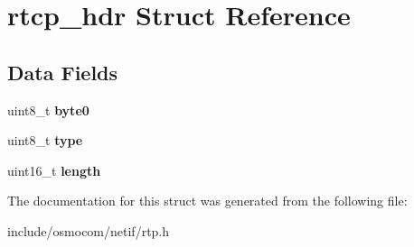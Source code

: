 \section{rtcp\+\_\+hdr Struct Reference}
\label{structrtcp__hdr}
\subsection*{Data Fields}
\begin{DoxyCompactItemize}
\item 
uint8\+\_\+t {\bfseries byte0}\label{structrtcp__hdr_a9d30cb444d699f9e1ba34f2097f98c8f}

\item 
uint8\+\_\+t {\bfseries type}\label{structrtcp__hdr_ad33487e2d4b04d22203523f424166d66}

\item 
uint16\+\_\+t {\bfseries length}\label{structrtcp__hdr_a81d21ccd495bbfa5bac3c162b53f2095}

\end{DoxyCompactItemize}


The documentation for this struct was generated from the following file\+:\begin{DoxyCompactItemize}
\item 
include/osmocom/netif/rtp.\+h\end{DoxyCompactItemize}

